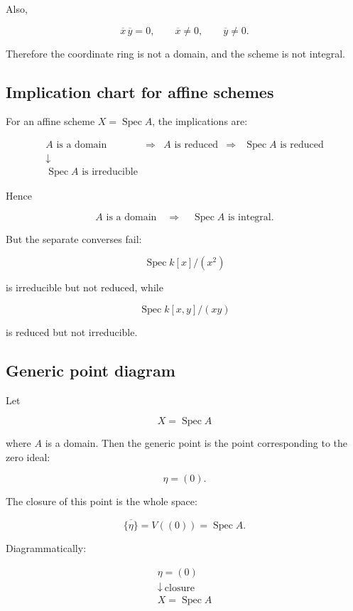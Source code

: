 \documentclass[12pt,a4paper]{article}
\theoremstyle{notespace}
\begin{document}
Also,

\[
\overline{x}\,\overline{y}=0,
\qquad
\overline{x}\neq 0,
\qquad
\overline{y}\neq 0.
\]

Therefore the coordinate ring is not a domain, and the scheme is not integral.

\subsection{Implication chart for affine schemes}

For an affine scheme \(X=\operatorname{Spec}A\), the implications are:

\[
\begin{array}{ccccc}
	A\text{ is a domain}
	&\Longrightarrow&
	A\text{ is reduced}
	&\Longrightarrow&
	\operatorname{Spec}A\text{ is reduced}
	\\[8pt]
	\downarrow
	&&
	&&
	\\[-2pt]
	\operatorname{Spec}A\text{ is irreducible}
	&&
	&&
\end{array}
\]

Hence

\[
A\text{ is a domain}
\quad\Longrightarrow\quad
\operatorname{Spec}A\text{ is integral}.
\]

But the separate converses fail:

\[
\operatorname{Spec}k[x]/(x^2)
\]

is irreducible but not reduced, while

\[
\operatorname{Spec}k[x,y]/(xy)
\]

is reduced but not irreducible.

\subsection{Generic point diagram}

Let

\[
X=\operatorname{Spec}A
\]

where \(A\) is a domain. Then the generic point is the point corresponding to the zero ideal:

\[
\eta=(0).
\]

The closure of this point is the whole space:

\[
\overline{\{\eta\}}
=
V((0))
=
\operatorname{Spec}A.
\]

Diagrammatically:

\[
\begin{array}{c}
	\eta=(0)
	\\[6pt]
	\downarrow\ \text{closure}
	\\[6pt]
	X=\operatorname{Spec}A
\end{array}
\]
\end{document}

